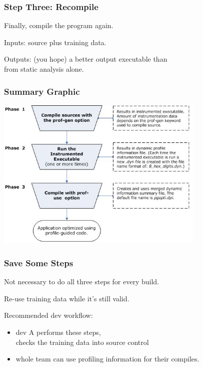 \begin{frame}
\frametitle{Step Three: Recompile}

\large
\begin{changemargin}{2cm}
Finally, compile the program again.

Inputs: source plus training data.

Outputs: (you hope) a better output executable than\\
from static analysis alone.
\end{changemargin}

\end{frame}



\begin{frame}
\frametitle{Summary Graphic}

\begin{center}
	\includegraphics[width=0.75\textwidth]{images/pogo-workflow.jpg}
\end{center}

\end{frame}



\begin{frame}
\frametitle{Save Some Steps}

\large
\begin{changemargin}{2cm}
Not necessary to do all three steps for every build. 

Re-use training data while it's still valid.

Recommended dev workflow:
\begin{itemize}
\item dev A performs these steps, \\
checks the training data into source control
\item whole team can use profiling information for their compiles.
\end{itemize}
\end{changemargin}

\end{frame}



